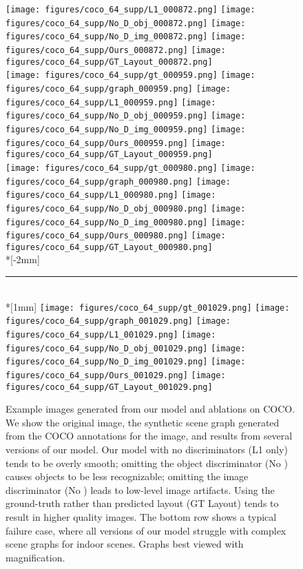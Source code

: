 \documentclass[10pt,twocolumn,letterpaper]{article}
\begin{document}
\begin{figure*}
  \texttt{[image: figures/coco\_64\_supp/L1\_000872.png]}
  \texttt{[image: figures/coco\_64\_supp/No\_D\_obj\_000872.png]}
  \texttt{[image: figures/coco\_64\_supp/No\_D\_img\_000872.png]}
  \texttt{[image: figures/coco\_64\_supp/Ours\_000872.png]}
  \texttt{[image: figures/coco\_64\_supp/GT\_Layout\_000872.png]} \\
  \texttt{[image: figures/coco\_64\_supp/gt\_000959.png]}
  \texttt{[image: figures/coco\_64\_supp/graph\_000959.png]}
  \texttt{[image: figures/coco\_64\_supp/L1\_000959.png]}
  \texttt{[image: figures/coco\_64\_supp/No\_D\_obj\_000959.png]}
  \texttt{[image: figures/coco\_64\_supp/No\_D\_img\_000959.png]}
  \texttt{[image: figures/coco\_64\_supp/Ours\_000959.png]}
  \texttt{[image: figures/coco\_64\_supp/GT\_Layout\_000959.png]} \\
  \texttt{[image: figures/coco\_64\_supp/gt\_000980.png]}
  \texttt{[image: figures/coco\_64\_supp/graph\_000980.png]}
  \texttt{[image: figures/coco\_64\_supp/L1\_000980.png]}
  \texttt{[image: figures/coco\_64\_supp/No\_D\_obj\_000980.png]}
  \texttt{[image: figures/coco\_64\_supp/No\_D\_img\_000980.png]}
  \texttt{[image: figures/coco\_64\_supp/Ours\_000980.png]}
  \texttt{[image: figures/coco\_64\_supp/GT\_Layout\_000980.png]} \\*[-2mm]
  \rule{\textwidth}{1pt} \\*[1mm]
  \texttt{[image: figures/coco\_64\_supp/gt\_001029.png]}
  \hspace*{1mm}\texttt{[image: figures/coco\_64\_supp/graph\_001029.png]}\hspace*{1mm}
  \texttt{[image: figures/coco\_64\_supp/L1\_001029.png]}
  \texttt{[image: figures/coco\_64\_supp/No\_D\_obj\_001029.png]}
  \texttt{[image: figures/coco\_64\_supp/No\_D\_img\_001029.png]}
  \texttt{[image: figures/coco\_64\_supp/Ours\_001029.png]}
  \texttt{[image: figures/coco\_64\_supp/GT\_Layout\_001029.png]} \\
  \caption{
    Example images generated from our model and ablations on COCO. We show the original image,
    the synthetic scene graph generated from the COCO annotations for the image, and results from
    several versions of our model. Our model with no discriminators (L1 only) tends to be overly smooth;
    omitting the object discriminator (No ) causes objects to be less recognizable; omitting
    the image discriminator (No ) leads to low-level image artifacts. Using the ground-truth
    rather than predicted layout (GT Layout) tends to result in higher quality images. The bottom
    row shows a typical failure case, where all versions of our model struggle with complex scene
    graphs for indoor scenes. Graphs best viewed with magnification.
  }
  \label{fig:more-qual}
\end{figure*}
\end{document}
